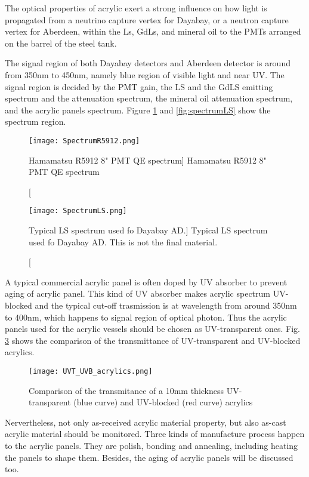 The optical properties of acrylic exert a strong influence on how light is propagated
from a neutrino capture vertex for Dayabay, or a neutron capture vertex for Aberdeen,
within the Ls, GdLs, and mineral oil to the PMTs arranged on the barrel of the steel tank.

The signal region of both Dayabay detectors and Aberdeen detector
is around from 350nm to 450nm, namely blue region of visible light and near UV.
The signal region is decided by the PMT gain, the LS and the GdLS emitting spectrum and
the attenuation spectrum, the mineral oil attenuation spectrum, and
the acrylic panels spectrum. Figure \ref{fig:SpectrumR5912} and \ref{fig:spectrumLS} show the spectrum region.


\begin{figure}
    \label{fig:SpectrumR5912}
    \centering
    \texttt{[image: SpectrumR5912.png]}
    \caption
    [Hamamatsu R5912 8" PMT QE spectrum]
    {Hamamatsu R5912 8" PMT QE spectrum}
    \end{figure}


\begin{figure}
    \label{fig:SpectrumLS}
    \centering
    \texttt{[image: SpectrumLS.png]}
    \caption
    [Typical LS spectrum used fo Dayabay AD.]
    {Typical LS spectrum used fo Dayabay AD. This is not the final material.}
    \end{figure}


A typical commercial acrylic panel is often doped by UV absorber
to prevent aging of acrylic panel. This kind of UV absorber makes acrylic spectrum
UV-blocked and the typical cut-off trasmission is at wavelength from around 350nm to 400nm,
which happens to signal region of optical photon.
Thus the acrylic panels used for the acrylic vessels should be chosen as
UV-transparent ones. Fig. \ref{UVTUVBAcrylics} shows the comparison of the transmittance of UV-transparent
and UV-blocked acrylics.


\begin{figure}
    \centering
    \texttt{[image: UVT\_UVB\_acrylics.png]}
    \caption{Comparison of the transmitance of a 10mm thickness UV-transparent (blue curve) and UV-blocked (red curve) acrylics}
    \label{UVTUVBAcrylics}
    \end{figure}



Nervertheless, not only as-received acrylic material property, but also as-cast
acrylic material should be monitored. Three kinds of manufacture process happen to the acrylic panels.
They are polish, bonding and annealing, including heating the panels to shape them. Besides,
the aging of acrylic panels will be discussed too.


